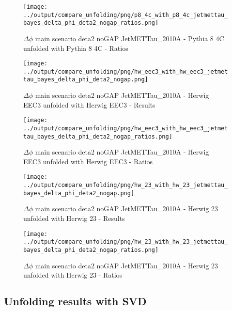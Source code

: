 \documentclass[11pt]{book}
\begin{document}
\begin{figure}[ht]
\centering
\texttt{[image: ../output/compare\_unfolding/png/p8\_4c\_with\_p8\_4c\_jetmettau\_bayes\_delta\_phi\_deta2\_nogap\_ratios.png]}
\caption{$\Delta\phi$ main scenario deta2 noGAP JetMETTau\_2010A - Pythia 8 4C unfolded with Pythia 8 4C - Ratios}
\label{p8_p8_jetmettau_bayes_delta_phi_deta2_nogap_b}
\end{figure}

\begin{figure}[ht]
\centering
\texttt{[image: ../output/compare\_unfolding/png/hw\_eec3\_with\_hw\_eec3\_jetmettau\_bayes\_delta\_phi\_deta2\_nogap.png]}
\caption{$\Delta\phi$ main scenario deta2 noGAP JetMETTau\_2010A - Herwig EEC3 unfolded with Herwig EEC3 - Results}
\label{hw_eec3_hw_eec3_jetmettau_bayes_delta_phi_deta2_nogap_a}
\end{figure}

\begin{figure}[ht]
\centering
\texttt{[image: ../output/compare\_unfolding/png/hw\_eec3\_with\_hw\_eec3\_jetmettau\_bayes\_delta\_phi\_deta2\_nogap\_ratios.png]}
\caption{$\Delta\phi$ main scenario deta2 noGAP JetMETTau\_2010A - Herwig EEC3 unfolded with Herwig EEC3 - Ratios}
\label{hw_eec3_hw_eec3_jetmettau_bayes_delta_phi_deta2_nogap_b}
\end{figure}

\begin{figure}[ht]
\centering
\texttt{[image: ../output/compare\_unfolding/png/hw\_23\_with\_hw\_23\_jetmettau\_bayes\_delta\_phi\_deta2\_nogap.png]}
\caption{$\Delta\phi$ main scenario deta2 noGAP JetMETTau\_2010A - Herwig 23 unfolded with Herwig 23 - Results}
\label{hw_23_hw_23_jetmettau_bayes_delta_phi_deta2_nogap_a}
\end{figure}

\begin{figure}[ht]
\centering
\texttt{[image: ../output/compare\_unfolding/png/hw\_23\_with\_hw\_23\_jetmettau\_bayes\_delta\_phi\_deta2\_nogap\_ratios.png]}
\caption{$\Delta\phi$ main scenario deta2 noGAP JetMETTau\_2010A - Herwig 23 unfolded with Herwig 23 - Ratios}
\label{hw_23_hw_23_jetmettau_bayes_delta_phi_deta2_nogap_b}
\end{figure}

\clearpage
\subsection{Unfolding results with SVD}
\end{document}
